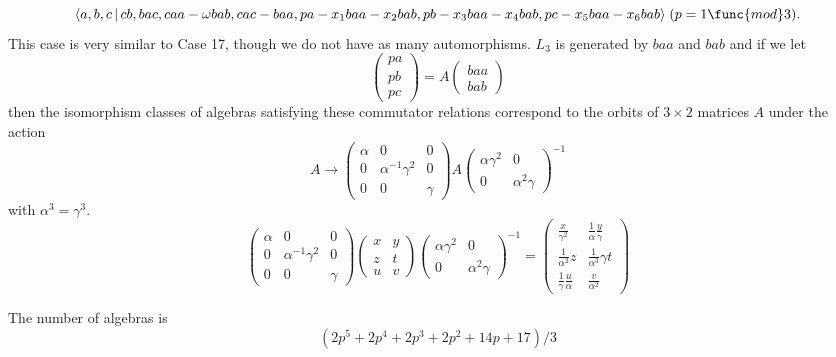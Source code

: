 \documentclass[10pt,thmsa]{article}
\begin{document}
\[
\langle a,b,c\,|\,cb,bac,caa-\omega
bab,cac-baa,pa-x_{1}baa-x_{2}bab,pb-x_{3}baa-x_{4}bab,pc-x_{5}baa-x_{6}bab%
\rangle \;(p=1\func{mod}3). 
\]%
This case is very similar to Case 17, though we do not have as many
automorphisms. $L_{3}$ is generated by $baa$ and $bab$ and if we let 
\[
\left( 
\begin{array}{l}
pa \\ 
pb \\ 
pc%
\end{array}%
\right) =A\left( 
\begin{array}{l}
baa \\ 
bab%
\end{array}%
\right) 
\]%
then the isomorphism classes of algebras satisfying these commutator
relations correspond to the orbits of $3\times 2$ matrices $A$ under the
action 
\[
A\rightarrow \left( 
\begin{array}{lll}
\alpha & 0 & 0 \\ 
0 & \alpha ^{-1}\gamma ^{2} & 0 \\ 
0 & 0 & \gamma%
\end{array}%
\right) A\left( 
\begin{array}{ll}
\alpha \gamma ^{2} & 0 \\ 
0 & \alpha ^{2}\gamma%
\end{array}%
\right) ^{-1} 
\]%
with $\alpha ^{3}=\gamma ^{3}$. 
\[
\left( 
\begin{array}{lll}
\alpha & 0 & 0 \\ 
0 & \alpha ^{-1}\gamma ^{2} & 0 \\ 
0 & 0 & \gamma%
\end{array}%
\right) \left( 
\begin{array}{ll}
x & y \\ 
z & t \\ 
u & v%
\end{array}%
\right) \left( 
\begin{array}{ll}
\alpha \gamma ^{2} & 0 \\ 
0 & \alpha ^{2}\gamma%
\end{array}%
\right) ^{-1}=\allowbreak \left( 
\begin{array}{cc}
\frac{x}{\gamma ^{2}} & \frac{1}{\alpha }\frac{y}{\gamma } \\ 
\frac{1}{\alpha ^{2}}z & \frac{1}{\alpha ^{3}}\gamma t \\ 
\frac{1}{\gamma }\frac{u}{\alpha } & \frac{v}{\alpha ^{2}}%
\end{array}%
\right) 
\]

The number of algebras is 
\[
(2p^5+2p^4+2p^3+2p^2+14p+17)/3 
\]
\end{document}
